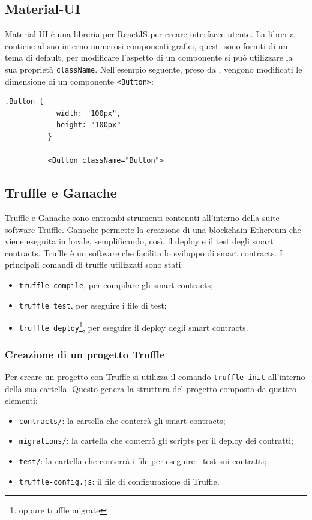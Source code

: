 \documentclass[a4paper]{article}
\begin{document}
        \subsection{Material-UI}
        Material-UI è una libreria per ReactJS per creare interfacce utente.
        La libreria contiene al suo interno numerosi componenti grafici,
        questi sono forniti di un tema di default, per modificare l'aspetto di
        un componente si può utilizzare la sua proprietà \verb|className|.
        \newline
        Nell'esempio seguente, preso da \cite{materialui}, vengono modificati le dimensione di un componente \verb|<Button>|:
        \begin{lstlisting}[style=ES6, title={Esempio modifica aspetto di un componente}]
          .Button {
            width: "100px",
            height: "100px"
          }

          <Button className="Button">\end{lstlisting}

        \subsection{Truffle e Ganache}
        Truffle e Ganache sono entrambi strumenti contenuti all'interno della suite software Truffle.
        Ganache permette la creazione di una blockchain Ethereum che viene eseguita in locale, semplificando, così,
        il deploy e il test degli smart contracts. Truffle è un software che facilita lo sviluppo di smart contracts.
        \newline
        I principali comandi di truffle utilizzati sono stati:
        \begin{itemize}
          \item \verb|truffle compile|, per compilare gli smart contracts;
          \item \verb|truffle test|, per eseguire i file di test;
          \item \verb|truffle deploy|\footnote{oppure truffle migrate}, per eseguire il deploy degli smart contracts\cite{truffle}.
        \end{itemize}
        \subsubsection{Creazione di un progetto Truffle}
        Per creare un progetto con Truffle si utilizza il comando \verb|truffle init| all'interno della sua cartella. Questo genera la struttura del progetto composta da quattro elementi:
        \begin{itemize}
          \item \verb|contracts/|: la cartella che conterrà gli smart contracts;
          \item \verb|migrations/|: la cartella che conterrà gli scripts per il deploy dei contratti;
          \item \verb|test/|: la cartella che conterrà i file per eseguire i test sui contratti;
          \item \verb|truffle-config.js|: il file di configurazione di Truffle.
        \end{itemize}
\end{document}
